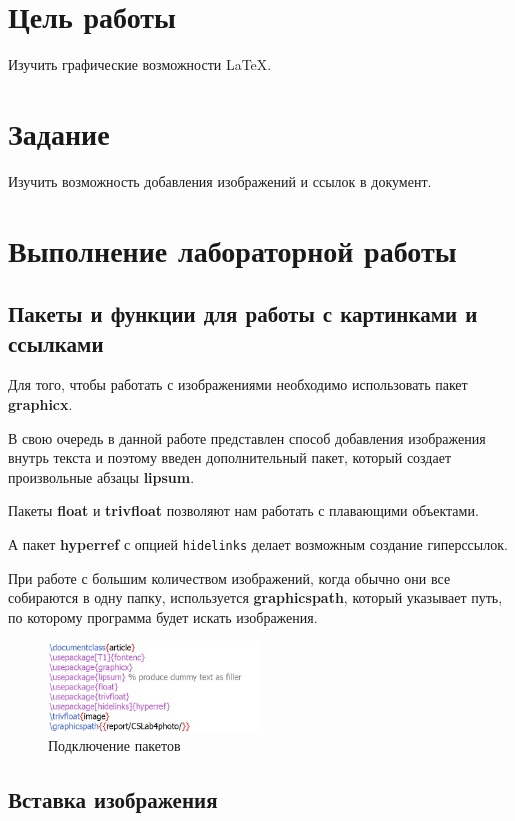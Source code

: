 \documentclass[a4paper,12pt]{article}
\begin{document}
\section{Цель работы}

Изучить графические возможности \LaTeX.

\section{Задание}

Изучить возможность добавления изображений и ссылок в документ.

\section{Выполнение лабораторной работы}

\subsection{Пакеты и функции для работы с картинками и ссылками}

Для того, чтобы работать с изображениями необходимо использовать пакет \textbf{graphicx}.

В свою очередь в данной работе представлен способ добавления изображения внутрь текста и поэтому введен дополнительный пакет, который создает произвольные абзацы \textbf{lipsum}.

Пакеты \textbf{float} и \textbf{trivfloat} позволяют нам работать с плавающими объектами.

А пакет \textbf{hyperref} с опцией \texttt{hidelinks} делает возможным создание гиперссылок.

При работе с большим количеством изображений, когда обычно они все собираются в одну папку, используется \textbf{graphicspath}, который указывает путь, по которому программа будет искать изображения.

\begin{figure}[h]
\centering
\includegraphics[width=0.5\textwidth]{bibl.JPG}
\caption{Подключение пакетов}
\label{fig:packages}
\end{figure}

\subsection{Вставка изображения}
\end{document}

